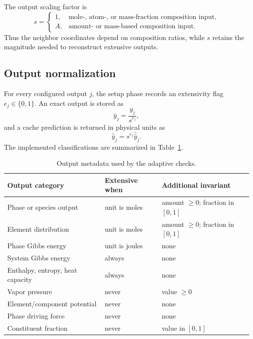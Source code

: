 \documentclass[11pt]{article}
\begin{document}
The output scaling factor is
\begin{equation}
  s=\begin{cases}
    1, & \text{mole-, atom-, or mass-fraction composition input},\\
    A, & \text{amount- or mass-based composition input}.
  \end{cases}
  \label{eq:scale}
\end{equation}
Thus the neighbor coordinates depend on composition ratios, while $s$ retains the magnitude needed
to reconstruct extensive outputs.

\subsection{Output normalization}

For every configured output $j$, the setup phase records an extensivity flag $e_j\in\{0,1\}$.
An exact output is stored as
\begin{equation}
  \bar y_j=\frac{y_j}{s^{e_j}},
  \label{eq:output-normalization}
\end{equation}
and a cache prediction is returned in physical units as
\begin{equation}
  \widehat y_j=s^{e_j}\widehat{\bar y}_j.
  \label{eq:output-rescaling}
\end{equation}
The implemented classifications are summarized in Table~\ref{tab:output-types}.

\begin{table}[htbp]
  \centering
  \caption{Output metadata used by the adaptive checks.}
  \label{tab:output-types}
  \begin{tabular}{lll}
    \toprule
    Output category & Extensive when & Additional invariant \\
    \midrule
    Phase or species output & unit is moles & amount $\geq 0$; fraction in $[0,1]$ \\
    Element distribution & unit is moles & amount $\geq 0$; fraction in $[0,1]$ \\
    Phase Gibbs energy & unit is joules & none \\
    System Gibbs energy & always & none \\
    Enthalpy, entropy, heat capacity & always & none \\
    Vapor pressure & never & value $\geq 0$ \\
    Element/component potential & never & none \\
    Phase driving force & never & none \\
    Constituent fraction & never & value in $[0,1]$ \\
    \bottomrule
  \end{tabular}
\end{table}
\end{document}
